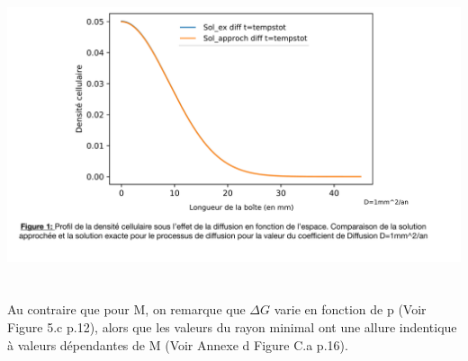 \documentclass[12pt,a4paper]{article}
\begin{document}
\\
\\
\includegraphics[page=5,scale=0.23]{FIGURES.pdf}
\\
\\
\\
 Au contraire que pour M, on remarque que $\Delta G$ varie en fonction de p (Voir Figure 5.c p.12), alors que les valeurs du rayon minimal ont une allure indentique à valeurs dépendantes de M (Voir Annexe d Figure C.a p.16). 
\\
\newpage
\\
\end{document}

